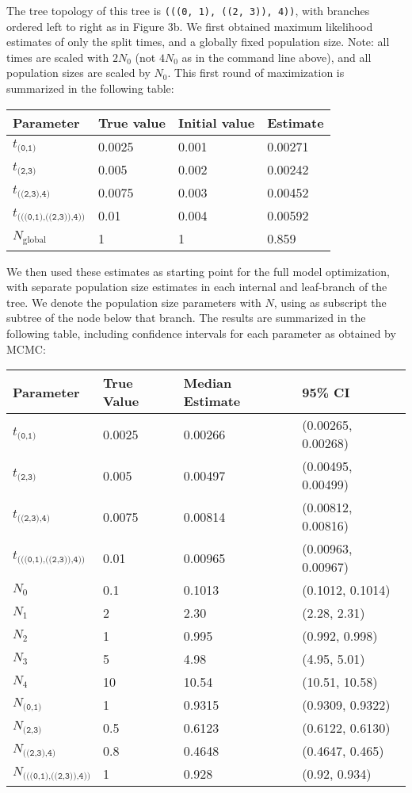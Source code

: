 \documentclass[a4paper]{article}
\begin{document}
The tree topology of this tree is \texttt{(((0, 1), ((2, 3)), 4))}, with branches ordered left to right as in Figure 3b.
We first obtained maximum likelihood estimates of only the split times, and a globally fixed population size. Note: all times are scaled with $2N_0$ (not $4N_0$ as in the command line above), and all population sizes are scaled by $N_0$. 
This first round of maximization is summarized in the following table:

\begin{tabular}{llll}
    \textbf{Parameter} & \textbf{True value} & \textbf{Initial value} & \textbf{Estimate}\\ \hline
    $t_\texttt{(0,1)}$ & 0.0025 & 0.001 & 0.00271\\
    $t_\texttt{(2,3)}$ & 0.005 & 0.002 & 0.00242\\
    $t_\texttt{((2,3),4)}$ & 0.0075 & 0.003 & 0.00452\\
    $t_\texttt{(((0,1),((2,3)),4))}$ & 0.01 & 0.004 & 0.00592\\
    $N_\textrm{global}$ & 1 & 1 & 0.859\\
\end{tabular}

We then used these estimates as starting point for the full model optimization, with separate population size estimates in each internal and leaf-branch of the tree. We denote the population size parameters with $N$, using as subscript the subtree of the node below that branch. The results are summarized in the following table, including confidence intervals for each parameter as obtained by MCMC:

\begin{tabular}{llll}
    \textbf{Parameter} & \textbf{True Value} & \textbf{Median Estimate} & \textbf{95\% CI}\\ \hline
    $t_\texttt{(0,1)}$ & 0.0025 & 0.00266 & (0.00265, 0.00268)\\
    $t_\texttt{(2,3)}$ & 0.005 & 0.00497 & (0.00495, 0.00499)\\
    $t_\texttt{((2,3),4)}$ & 0.0075 & 0.00814 & (0.00812, 0.00816)\\
    $t_\texttt{(((0,1),((2,3)),4))}$ & 0.01 & 0.00965 & (0.00963, 0.00967)\\
    $N_0$ & 0.1 & 0.1013 & (0.1012, 0.1014)\\
    $N_1$ & 2 & 2.30 & (2.28, 2.31)\\
    $N_2$ & 1 & 0.995 & (0.992, 0.998)\\
    $N_3$ & 5 & 4.98 & (4.95, 5.01)\\
    $N_4$ & 10 & 10.54 & (10.51, 10.58)\\
    $N_\texttt{(0,1)}$ & 1 & 0.9315 & (0.9309, 0.9322)\\
    $N_\texttt{(2,3)}$ & 0.5 & 0.6123 & (0.6122, 0.6130)\\
    $N_\texttt{((2,3),4)}$ & 0.8 & 0.4648 & (0.4647, 0.465)\\
    $N_\texttt{(((0,1),((2,3)),4))}$ & 1 & 0.928 & (0.92, 0.934)\\
\end{tabular}
\end{document}
